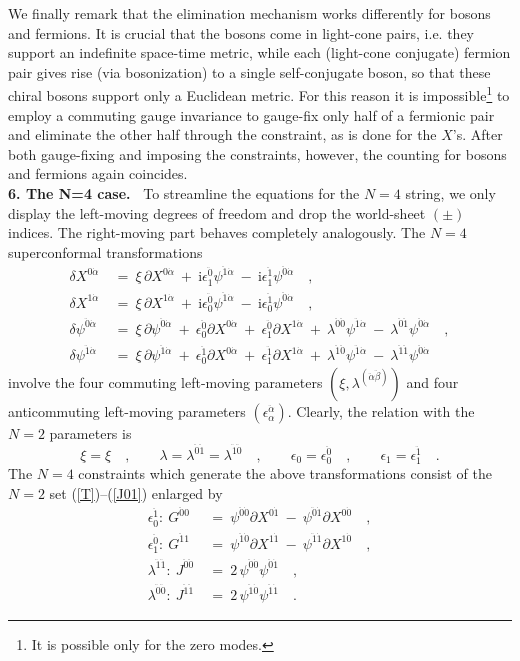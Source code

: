 \documentclass[a4paper,11pt]{article}
\def\a{\alpha}
\def\de{\delta}
\def\eps{\epsilon}
\def\l{\lambda}
\def\x{\xi}
\def\j{\psi}
\def\i{\textrm{i}}
\def\N2{$N{=}2$}
\def\NN4{$N{=}4$}
\def\pa{\mbox{$\partial$}}
\def\ad{{\dot{\alpha}}}
\def\zd{{\dot{0}}}
\def\od{{\dot{1}}}
\def\add{{\ddot{\alpha}}}
\def\bdd{{\ddot{\beta}}}
\def\zdd{{\ddot{0}}}
\def\odd{{\ddot{1}}}
\begin{document}
We finally remark that the elimination mechanism works differently for bosons 
and fermions. It is crucial that the bosons come in light-cone pairs, i.e.
they support an indefinite space-time metric, while each (light-cone conjugate)
fermion pair gives rise (via bosonization) to a single self-conjugate boson,
so that these chiral bosons support only a Euclidean metric.
For this reason it is impossible\footnote{
It is possible only for the zero modes.} 
to employ a commuting gauge invariance to gauge-fix only half 
of a fermionic pair and eliminate the other half through the constraint, 
as is done for the $X$'s.
After both gauge-fixing and imposing the constraints, however, the counting
for bosons and fermions again coincides.
\\


\bigskip
\noindent
{\bf 6. The N=4 case.\  }
To streamline the equations for the \NN4 string, 
we only display the left-moving degrees of freedom 
and drop the world-sheet $(\pm)$ indices. 
The right-moving part behaves completely analogously.
The \NN4 superconformal transformations 
\begin{align} \label{N41}
\de X^{0\ad}\ &=\ \x\,\pa X^{0\ad}\
+\ \i\eps_1^\zdd\j^{\odd\ad}\ -\ \i\eps_1^\odd\j^{\zdd\ad} \quad , \\
\de X^{1\ad}\ &=\ \x\,\pa X^{1\ad}\
+\ \i\eps_0^\zdd\j^{\odd\ad}\ -\ \i\eps_0^\odd\j^{\zdd\ad} \quad , \\
\de\j^{\zdd\ad}\ &=\ \x\,\pa \j^{\zdd\ad}\
+\ \eps_0^\zdd \pa X^{0\ad}\ +\ \eps_1^\zdd \pa X^{1\ad}\
+\ \l^{\zdd\zdd} \j^{\odd\ad}\ -\ \l^{\zdd\odd} \j^{\zdd\ad} \quad , \\
\de\j^{\odd\ad}\ &=\ \x\,\pa \j^{\odd\ad}\
+\ \eps_0^\odd \pa X^{0\ad}\ +\ \eps_1^\odd \pa X^{1\ad}\
+\ \l^{\odd\zdd} \j^{\odd\ad}\ -\ \l^{\odd\odd} \j^{\zdd\ad} 
\label{N44}
\end{align}
involve the four commuting left-moving parameters $(\x,\l^{(\add\bdd)})$
and four anticommuting left-moving parameters $(\eps_\a^\add)$.
Clearly, the relation with the \N2 parameters is
\begin{equation}
\x=\x \quad,\qquad
\l=\l^{\zdd\odd}=\l^{\odd\zdd} \quad,\qquad
\eps_0= \eps_0^\zdd \quad,\qquad
\eps_1= \eps_1^\odd \quad.
\end{equation}
The \NN4 constraints which generate the above transformations
consist of the \N2 set
(\ref{T})--(\ref{J01}) enlarged by
\begin{align}
\eps_0^\odd:\
G^{\zdd 0}\ &=\ \j^{\zdd\zd} \pa X^{0\od}\ -\ \j^{\zdd\od} \pa X^{0\zd} \quad,
\label{G00} \\
\eps_1^\zdd:\
G^{\odd 1}\ &=\ \j^{\odd\zd} \pa X^{1\od}\ -\ \j^{\odd\od} \pa X^{1\zd} \quad, 
\label{G11} \\
\l^{\odd\odd}:\
J^{\zdd\zdd}\ &=\ 2\,\j^{\zdd\zd} \j^{\zdd\od} \quad,
\label{J00} \\
\l^{\zdd\zdd}:\
J^{\odd\odd}\ &=\ 2\,\j^{\odd\zd} \j^{\odd\od} \quad.
\label{J11}
\end{align}
\end{document}
